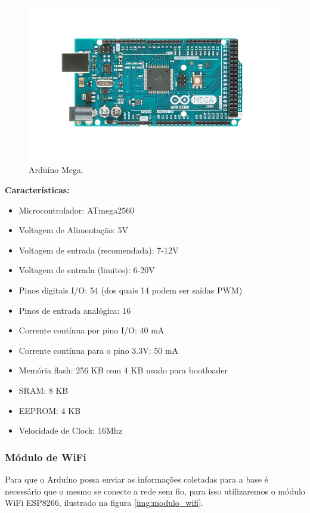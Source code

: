     \begin{figure}[H]                                                  
      \centering                                                       
      \includegraphics[scale=0.4]{figuras/arduino_mega.png} 
      \caption{Arduíno Mega.}                  
      \label{img:arduino_mega}                                             
    \end{figure}                                                       

 	\textbf{Características:}
    \begin{itemize}
      \item Microcontrolador: ATmega2560
      \item Voltagem de Alimentação: 5V
      \item Voltagem de entrada (recomendada): 7-12V
      \item Voltagem de entrada (limites): 6-20V
      \item Pinos digitais I/O: 54 (dos quais 14 podem ser saídas PWM)
      \item Pinos de entrada analógica: 16
      \item Corrente contínua por pino I/O: 40 mA
      \item Corrente contínua para o pino 3.3V: 50 mA
      \item Memória flash: 256 KB com 4 KB usado para bootloader
      \item SRAM: 8 KB
      \item EEPROM: 4 KB
      \item Velocidade de Clock: 16Mhz
    \end{itemize}
  
  \subsubsection{Módulo de WiFi}
  \label{sub:Modulo_de_wifi}
    Para que o Arduíno possa enviar as informações coletadas para a base é necessário que o mesmo se conecte a rede sem fio, para isso utilizaremos o módulo WiFi ESP8266, ilustrado na figura \ref{img:modulo_wifi}.

